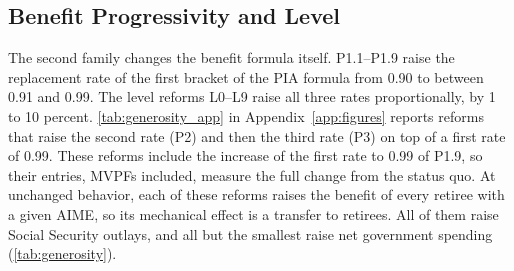 \subsection{Benefit Progressivity and Level}\label{sec:results_generosity}

The second family changes the benefit formula itself. P1.1--P1.9 raise the replacement rate of the first bracket of the PIA formula from 0.90 to between 0.91 and 0.99. The level reforms L0--L9 raise all three rates proportionally, by 1 to 10 percent. \autoref{tab:generosity_app} in Appendix~\ref{app:figures} reports reforms that raise the second rate (P2) and then the third rate (P3) on top of a first rate of 0.99. These reforms include the increase of the first rate to 0.99 of P1.9, so their entries, MVPFs included, measure the full change from the status quo. At unchanged behavior, each of these reforms raises the benefit of every retiree with a given AIME, so its mechanical effect is a transfer to retirees. All of them raise Social Security outlays, and all but the smallest raise net government spending (\autoref{tab:generosity}).

